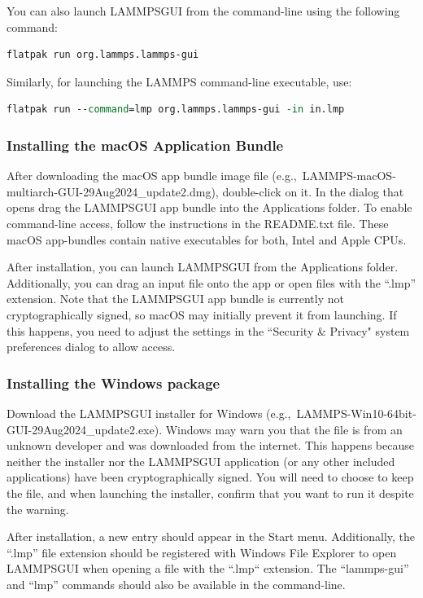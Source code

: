 \documentclass[9pt,tutorial]{livecoms}
\newcommand{\lammpsgui}{\textsf{LAMMPS\textendash GUI}}
\begin{document}
\begin{appendices}
You can also launch \lammpsgui{} from the command-line using the following command:
\begin{lstlisting}[language=tcl]
flatpak run org.lammps.lammps-gui
\end{lstlisting}
Similarly, for launching the LAMMPS command-line executable, use:
\begin{lstlisting}[language=tcl]
flatpak run --command=lmp org.lammps.lammps-gui -in in.lmp
\end{lstlisting}

\subsubsection{Installing the macOS Application Bundle}

After downloading the macOS app bundle image file
(e.g.,~LAMMPS-macOS-multiarch-GUI-29Aug2024\_update2.dmg), double-click
on it.  In the dialog that opens drag the \lammpsgui{} app bundle into
the Applications folder.  To enable command-line access, follow the
instructions in the README.txt file.  These macOS app-bundles contain
native executables for both, Intel and Apple CPUs.

After installation, you can launch \lammpsgui{} from the Applications
folder.  Additionally, you can drag an input file onto the app or open
files with the ``.lmp'' extension.  Note that the \lammpsgui{} app bundle is
currently not cryptographically signed, so macOS may initially prevent
it from launching.  If this happens, you need to adjust the settings in
the ``Security \& Privacy" system preferences dialog to allow access.

\subsubsection{Installing the Windows package}

Download the \lammpsgui{} installer for Windows
(e.g.,~LAMMPS-Win10-64bit-GUI-29Aug2024\_update2.exe).  Windows may warn
you that the file is from an unknown developer and was downloaded from
the internet.  This happens because neither the installer nor the
\lammpsgui{} application (or any other included applications) have been
cryptographically signed.  You will need to choose to keep the file, and
when launching the installer, confirm that you want to run it despite
the warning.

After installation, a new entry should appear in the Start menu.
Additionally, the ``.lmp'' file extension should be registered with
Windows File Explorer to open \lammpsgui{} when opening a file with the
``.lmp`` extension.  The ``lammps-gui'' and ``lmp'' commands should also
be available in the command-line.


\end{appendices}
\end{document}
